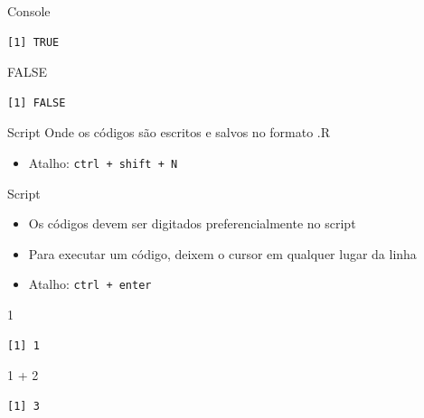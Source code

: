 \documentclass[
  ignorenonframetext,
]{beamer}
\newenvironment{Shaded}{\begin{snugshade}}{\end{snugshade}}
\newcommand{\ConstantTok}[1]{\textcolor[rgb]{0.56,0.35,0.01}{#1}}
\newcommand{\DecValTok}[1]{\textcolor[rgb]{0.68,0.00,0.00}{#1}}
\newcommand{\SpecialCharTok}[1]{\textcolor[rgb]{0.37,0.37,0.37}{#1}}
\providecommand{\tightlist}{%
  \setlength{\itemsep}{0pt}\setlength{\parskip}{0pt}}\usepackage{longtable,booktabs,array}
\begin{document}
\begin{frame}[fragile]{}
\begin{block}{Console}
\begin{verbatim}
[1] TRUE
\end{verbatim}

\begin{Shaded}
\begin{Highlighting}[]
\ConstantTok{FALSE}
\end{Highlighting}
\end{Shaded}

\begin{verbatim}
[1] FALSE
\end{verbatim}
\end{block}

\begin{block}{Script}
\protect\hypertarget{script}{}
Onde os códigos são escritos e salvos no formato .R

\begin{itemize}
\tightlist
\item
  Atalho: \texttt{ctrl\ +\ shift\ +\ N}
\end{itemize}
\end{block}

\begin{block}{Script}
\protect\hypertarget{script-1}{}
\begin{itemize}
\item
  Os códigos devem ser digitados preferencialmente no script
\item
  Para executar um código, deixem o cursor em qualquer lugar da linha
\item
  Atalho: \texttt{ctrl\ +\ enter}
\end{itemize}

\begin{Shaded}
\begin{Highlighting}[]
\DecValTok{1}
\end{Highlighting}
\end{Shaded}

\begin{verbatim}
[1] 1
\end{verbatim}

\begin{Shaded}
\begin{Highlighting}[]
\DecValTok{1} \SpecialCharTok{+} \DecValTok{2}
\end{Highlighting}
\end{Shaded}

\begin{verbatim}
[1] 3
\end{verbatim}
\end{block}


\end{frame}
\end{document}
